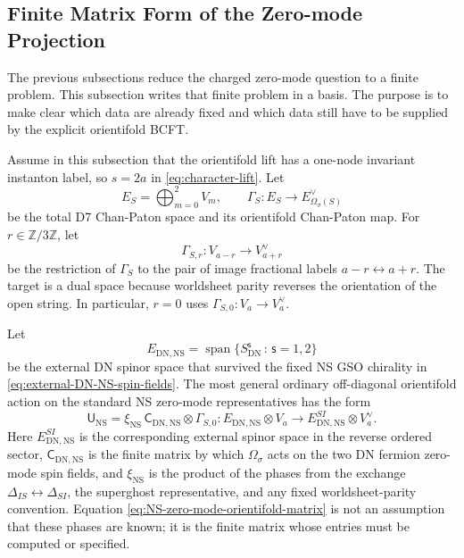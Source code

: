 \documentclass[11pt]{article}
\newcommand{\Z}{\mathbb{Z}}
\newcommand{\NS}{\mathrm{NS}}
\newcommand{\DN}{\mathrm{DN}}
\newcommand{\orient}{\Omega_\sigma}
\begin{document}
\subsection{Finite Matrix Form of the Zero-mode Projection}

The previous subsections reduce the charged zero-mode question to a finite problem. This
subsection writes that finite problem in a basis. The purpose is to make clear which data are
already fixed and which data still have to be supplied by the explicit orientifold BCFT.

Assume in this subsection that the orientifold lift has a one-node invariant instanton label,
so \(s=2a\) in \eqref{eq:character-lift}. Let
\begin{equation}
  E_S=\bigoplus_{m=0}^{2}V_m,
  \qquad
  \Gamma_S:E_S\longrightarrow E_{\orient(S)}^\vee
  \label{eq:D7-orientifold-map-local-definition}
\end{equation}
be the total D7 Chan-Paton space and its orientifold Chan-Paton map. For \(r\in\Z/3\Z\), let
\begin{equation}
  \Gamma_{S,r}:V_{a-r}\longrightarrow V_{a+r}^{\vee}
  \label{eq:D7-orientifold-map-by-charge}
\end{equation}
be the restriction of \(\Gamma_S\) to the pair of image
fractional labels \(a-r\leftrightarrow a+r\). The target is a dual space because worldsheet
parity reverses the orientation of the open string. In particular, \(r=0\) uses
\(\Gamma_{S,0}:V_a\to V_a^\vee\).

Let
\begin{equation}
  E_{\DN,\NS}=\operatorname{span}\{S_{\DN}^{\mathsf s}\,:\,\mathsf s=1,2\}
  \label{eq:external-DN-NS-spinor-space}
\end{equation}
be the external DN spinor space that survived the fixed NS GSO chirality in
\eqref{eq:external-DN-NS-spin-fields}. The most general ordinary off-diagonal orientifold action
on the standard NS zero-mode representatives has the form
\begin{equation}
  \mathsf U_{\NS}
  =
  \xi_{\NS}\,
  \mathsf C_{\DN,\NS}\otimes\Gamma_{S,0}
  :
  E_{\DN,\NS}\otimes V_a
  \longrightarrow
  E_{\DN,\NS}^{SI}\otimes V_a^\vee .
  \label{eq:NS-zero-mode-orientifold-matrix}
\end{equation}
Here \(E_{\DN,\NS}^{SI}\) is the corresponding external spinor space in the reverse ordered
sector, \(\mathsf C_{\DN,\NS}\) is the finite matrix by which \(\orient\) acts on the two DN
fermion zero-mode spin fields, and \(\xi_{\NS}\) is the product of the phases from the exchange
\(\Delta_{IS}\leftrightarrow\Delta_{SI}\), the superghost representative, and any fixed
worldsheet-parity convention. Equation \eqref{eq:NS-zero-mode-orientifold-matrix} is not an
assumption that these phases are known; it is the finite matrix whose entries must be computed or
specified.
\end{document}
